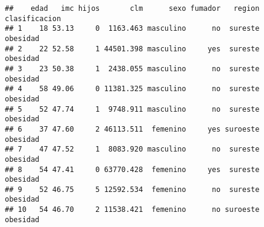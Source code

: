 \documentclass[
]{article}
\begin{document}
\begin{verbatim}
##    edad   imc hijos       clm      sexo fumador   region clasificacion
## 1    18 53.13     0  1163.463 masculino      no  sureste      obesidad
## 2    22 52.58     1 44501.398 masculino     yes  sureste      obesidad
## 3    23 50.38     1  2438.055 masculino      no  sureste      obesidad
## 4    58 49.06     0 11381.325 masculino      no  sureste      obesidad
## 5    52 47.74     1  9748.911 masculino      no  sureste      obesidad
## 6    37 47.60     2 46113.511  femenino     yes suroeste      obesidad
## 7    47 47.52     1  8083.920 masculino      no  sureste      obesidad
## 8    54 47.41     0 63770.428  femenino     yes  sureste      obesidad
## 9    52 46.75     5 12592.534  femenino      no  sureste      obesidad
## 10   54 46.70     2 11538.421  femenino      no suroeste      obesidad
\end{verbatim}
\end{document}
